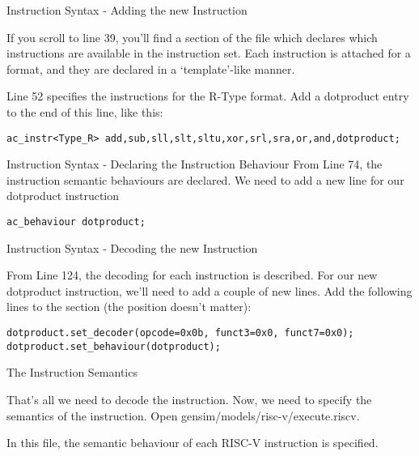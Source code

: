 \begin{frame}[fragile]{Instruction Syntax - Adding the new Instruction}

If you scroll to line 39, you'll find a section of the file which 
declares which instructions are available in the instruction set. Each
instruction is attached for a format, and they are declared in a 
`template'-like manner.

\smallskip

Line 52 specifies the instructions for the R-Type format. Add a 
{\ttfamily dotproduct} entry to the end of this line, like this:

\begin{lstlisting}
ac_instr<Type_R> add,sub,sll,slt,sltu,xor,srl,sra,or,and,dotproduct;
\end{lstlisting}

\end{frame}

\begin{frame}[fragile]{Instruction Syntax - Declaring the Instruction Behaviour}
From Line 74, the instruction semantic behaviours are declared. We need
to add a new line for our dotproduct instruction

\begin{lstlisting}
ac_behaviour dotproduct;
\end{lstlisting}

\end{frame}

\begin{frame}[fragile]{Instruction Syntax - Decoding the new Instruction}

From Line 124, the decoding for each instruction is described. For our
new dotproduct instruction, we'll need to add a couple of new lines. 
Add the following lines to the section (the position doesn't matter):

\begin{lstlisting}
dotproduct.set_decoder(opcode=0x0b, funct3=0x0, funct7=0x0);
dotproduct.set_behaviour(dotproduct);
\end{lstlisting}

\end{frame}

\begin{frame}{The Instruction Semantics}

That's all we need to decode the instruction. Now, we need to specify
the semantics of the instruction. Open {\ttfamily gensim/models/risc-v/execute.riscv}.

\bigskip

In this file, the semantic behaviour of each RISC-V instruction is specified.

\end{frame}

